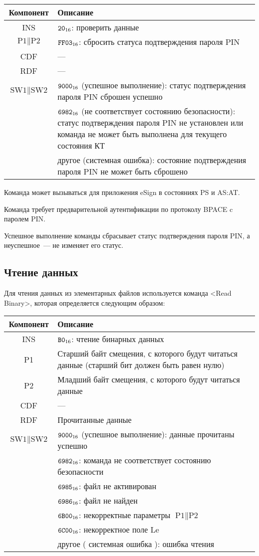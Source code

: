 \noindent
\begin{tabular}{|c|p{14cm}|}
\hline
Компонент & Описание \\
\hline
\hline
INS & $\texttt{20}_{16}$: проверить данные\\
\hline
$\text{P1} \parallel \text{P2}$ & $\texttt{FF03}_{16}$: сбросить статуса подтверждения
пароля PIN  \\
\hline
CDF & ---
\\
\hline \hline
RDF &  --- \\
\hline
$\text{SW1} \parallel \text{SW2}$ & $\texttt{9000}_{16}$ 
(успешное выполнение): статус подтверждения пароля PIN сброшен успешно\\
 & $\texttt{6982}_{16}$ (не соответствует состоянию безопасности): 
статус подтверждения пароля PIN не установлен
или команда не может быть выполнена для текущего состояния КТ\\
 & другое (системная ошибка): состояние подтверждения 
пароля PIN не может быть сброшено\\
\hline
\end{tabular}

Команда может вызываться для приложения eSign  
в состояниях PS и AS:AT.

Команда требует предварительной аутентификации 
по протоколу BPACE c паролем PIN.

Успешное выполнение команды сбрасывает статус подтверждения пароля PIN,
а неуспешное~--- не изменяет его статус.

\subsection{Чтение данных}
\label{Oper.Descr.Read}

Для чтения данных из элементарных файлов 
используется команда <Read Binary>, 
которая определяется следующим образом:

\noindent
\begin{tabular}{|c|p{14cm}|}
\hline
Компонент & Описание \\
\hline
\hline
INS & $\texttt{B0}_{16}$: чтение бинарных данных \\
\hline
P1 & Старший байт смещения, с которого будут читаться данные (старший бит 
должен быть равен нулю) \\
\hline
P2 & Младший байт смещения, с которого будут читаться данные\\
\hline
CDF &  --- \\
\hline \hline
RDF & 	Прочитанные данные \\
\hline
$\text{SW1} \parallel\text{SW2}$ & 
$\texttt{9000}_{16}$ (успешное выполнение): данные прочитаны успешно \\
 & $\texttt{6982}_{16}$: команда не соответствует состоянию безопасности \\
 & $\texttt{6985}_{16}$: файл не активирован \\
 & $\texttt{6986}_{16}$: файл не найден \\
 & $\texttt{6B00}_{16}$: некорректные параметры $\text{P1} \parallel\text{P2}$ \\
 & $\texttt{6C00}_{16}$: некорректное поле Le \\
 & другое ( системная ошибка ): ошибка чтения \\
\hline
\end{tabular}

